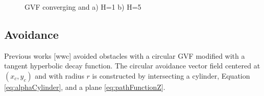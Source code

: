 \documentclass[conf]{new-aiaa}
\begin{document}
\begin{figure}[H]
	\begin{subfigmatrix}{2}%
		\centering	
		
		\hspace*{0mm}
	\end{subfigmatrix}
	\caption{GVF converging and a) H=1 b) H=5}
	\label{fig:GVFLine}
\end{figure} 



\subsection{Avoidance}

Previous works [wwc] avoided obstacles with a circular GVF modified with a tangent hyperbolic decay function. The circular avoidance vector field centered at $(x_c,y_c)$ and with radius $r$ is constructed by intersecting a cylinder, Equation \ref{eq:alphaCylinder}, and a plane \ref{eq:pathFunctionZ}. 
\end{document}
